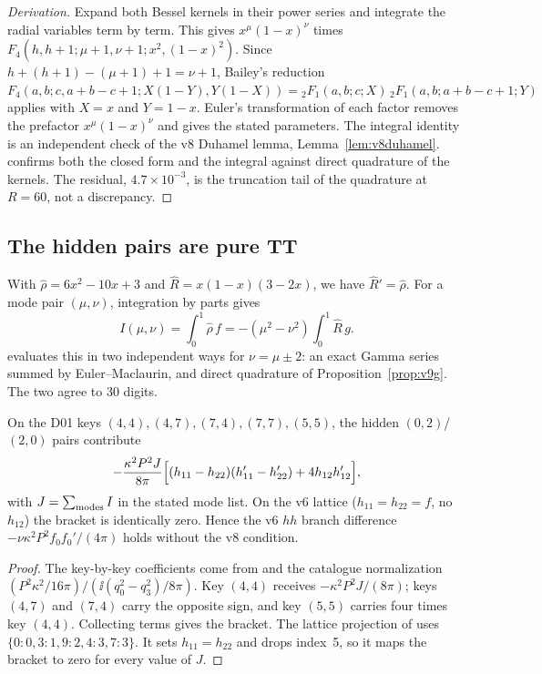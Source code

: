 \begin{proof}[Derivation]
Expand both Bessel kernels in their power series and integrate the
radial variables term by term. This gives
\(x^\mu(1-x)^\nu\) times
\(F_4(h,h+1;\mu+1,\nu+1;x^2,(1-x)^2)\). Since
\(h+(h+1)-(\mu+1)+1=\nu+1\), Bailey's reduction
\(F_4(a,b;c,a+b-c+1;X(1-Y),Y(1-X))={}_2F_1(a,b;c;X)\,{}_2F_1(a,b;a+b-c+1;Y)\)
applies with \(X=x\) and \(Y=1-x\). Euler's transformation of each
factor removes the prefactor \(x^\mu(1-x)^\nu\) and gives the
stated parameters. The integral identity is an independent check
of the v8 Duhamel lemma, Lemma~\ref{lem:v8duhamel}.
 confirms both the closed form and
the integral against direct quadrature of the kernels. The
residual, \(4.7\times10^{-3}\), is the truncation tail of the
quadrature at \(R=60\), not a discrepancy.
\end{proof}

\subsection{The hidden pairs are pure TT}

With \(\hat\rho=6x^2-10x+3\) and
\(\hat R=x(1-x)(3-2x)\), we have \(\hat R'=\hat\rho\). For a mode
pair \((\mu,\nu)\), integration by parts gives
\[
 I(\mu,\nu)=\int_0^1\hat\rho\,f
 =-(\mu^2-\nu^2)\int_0^1\hat R\,g .
\]
 evaluates this in two independent ways
for \(\nu=\mu\pm2\): an exact Gamma series summed by
Euler--Maclaurin, and direct quadrature of
Proposition~\ref{prop:v9g}. The two agree to 30 digits.

\begin{proposition}
\label{prop:v9TT}
On the D01 keys \((4,4),(4,7),(7,4),(7,7),(5,5)\), the hidden
\((0,2)\)/\((2,0)\) pairs contribute
\[
 -\frac{\kappa^2P^2J}{8\pi}\Bigl[(h_{11}-h_{22})(h'_{11}-h'_{22})
 +4h_{12}h'_{12}\Bigr],
\]
with \(J=\sum_{\rm modes}I\) in the stated mode list. On the v6 lattice
(\(h_{11}=h_{22}=f\), no \(h_{12}\)) the bracket is identically zero.
Hence the v6 \(hh\) branch difference
\(-\nu\kappa^2P^2f_0f_0'/(4\pi)\) holds without the v8 condition.
\end{proposition}

\begin{proof}
The key-by-key coefficients come from
 and the catalogue
normalization
\((P^2\kappa^2/16\pi)/(\ii(q_0^2-q_3^2)/8\pi)\). Key \((4,4)\)
receives \(-\kappa^2P^2J/(8\pi)\); keys \((4,7)\) and \((7,4)\) carry
the opposite sign, and key \((5,5)\) carries four times key
\((4,4)\). Collecting terms gives the bracket. The lattice
projection of  uses
\(\{0{:}0,3{:}1,9{:}2,4{:}3,7{:}3\}\). It sets \(h_{11}=h_{22}\)
and drops index~5, so it maps the bracket to zero for every value
of \(J\).
\end{proof}

